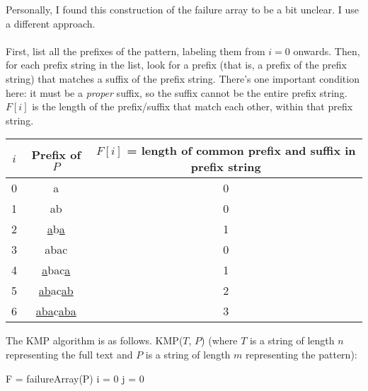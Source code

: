 \documentclass[]{article}
\theoremstyle{definition}
\begin{document}
				Personally, I found this construction of the failure array to be a bit unclear. I use a different approach.
				\\ \\
				First, list all the prefixes of the pattern, labeling them from $i = 0$ onwards. Then, for each prefix string in the list, look for a prefix (that is, a prefix of the prefix string) that matches a suffix of the prefix string. There's one important condition here: it must be a \emph{proper} suffix, so the suffix cannot be the entire prefix string. $F[i]$ is the length of the prefix/suffix that match each other, within that prefix string.

				\begin{center}
					\begin{tabular}{|c|c|c|}
						\hline
						$i$ & Prefix of $P$ & $F[i]$ = length of common prefix and suffix in prefix string \\ \hline
							0 & a & 0 \\
							1 & ab & 0 \\
							2 & \underline{a}b\underline{a} & 1 \\
							3 & abac & 0 \\
							4 & \underline{a}bac\underline{a} & 1 \\
							5 & \underline{ab}ac\underline{ab} & 2 \\
							6 & \underline{aba}c\underline{aba} & 3 \\ \hline
					\end{tabular}
				\end{center}

				The KMP algorithm is as follows. KMP($T$, $P$) (where $T$ is a string of length $n$ representing the full text and $P$ is a string of length $m$ representing the pattern): \\
				\begin{algorithm}[H]
					F = failureArray(P)\;
					i = 0\;
					j = 0\;
				\end{algorithm}
\end{document}
